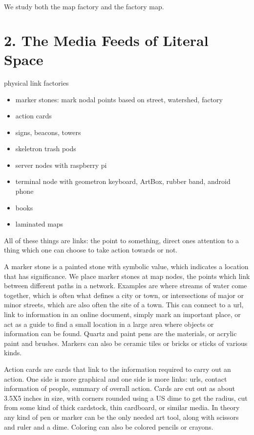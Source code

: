 \documentclass[11pt]{article}
\begin{document}
We study both the map factory and the factory map.  



\section{2. The Media Feeds of Literal Space}


physical link factories


\begin{itemize}

\item
marker stones: mark nodal points based on street, watershed, factory
\item
action cards
\item
signs, beacons, towers
\item
skeletron trash pods
\item
server nodes with raspberry pi
\item
terminal node with geometron keyboard, ArtBox, rubber band, android phone
\item
books
\item
laminated maps
\end{itemize}


All of these things are links: the point to something, direct ones attention to a thing which one can choose to take action towards or not.  




A marker stone is a painted stone with symbolic value, which indicates a location that has significance.  We place marker stones at map nodes, the points which link between different paths in a network.  Examples are where streams of water come together, which is often what defines a city or town, or intersections of major or minor streets, which are also often the site of a town.  This can connect to a url, link to information in an online document, simply mark an important place, or act as a guide to find a small location in a large area where objects or information can be found.  Quartz and paint pens are the materials, or acrylic paint and brushes.  Markers can also be ceramic tiles or bricks or sticks of various kinds.




Action cards are cards that link to the information required to carry out an action.  One side is more graphical and one side is more links: urls, contact information of people, summary of overall action.  Cards are cut out as about 3.5X5 inches in size, with corners rounded using a US dime to get the radius, cut from some kind of thick cardstock, thin cardboard, or similar media. In theory any kind of pen or marker can be the only needed art tool, along with scissors and ruler and a dime.  Coloring can also be colored pencils or crayons.
\end{document}

